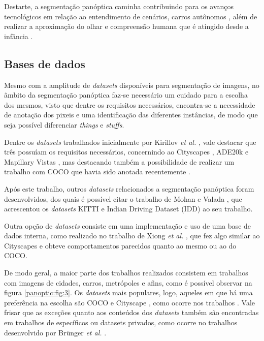 Destarte, a segmentação panóptica caminha contribuindo para os avanços tecnológicos em relação ao entendimento de cenários, carros autônomos \cite{Liu2019}, além de realizar a aproximação do olhar e compreensão humana que é atingido desde a infância \cite{Mohan2020}.

\subsection{Bases de dados}
\label{panoptic:dataset}
Mesmo com a amplitude de \textit{datasets} disponíveis para segmentação de imagens, no âmbito da segmentação panóptica faz-se necessário um cuidado para a escolha dos mesmos, visto que dentre os requisitos necessários, encontra-se a necessidade de anotação dos pixeis e uma identificação das diferentes instâncias, de modo que seja possível diferenciar \textit{things} e \textit{stuffs}.

Dentre os \textit{datasets} trabalhados inicialmente por Kirillov \textit{et al.} \cite{Kirillov2019a}, vale destacar que três possuíam os requisitos necessários, concernindo ao Cityscapes \cite{Cordts2016}, ADE20k \cite{Zhou2016} e Mapillary Vistas \cite{Neuhold2017_ICCV}, mas destacando também a possibilidade de realizar um trabalho com COCO \cite{Lin2014} que havia sido anotada recentemente \cite{Kirillov2019a}.

Após este trabalho, outros \textit{datasets} relacionados a segmentação panóptica foram desenvolvidos, dos quais é possível citar o trabalho de Mohan e Valada \cite{Mohan2020}, que acrescentou os \textit{datasets} KITTI \cite{Geiger2013} e Indian Driving Dataset (IDD) \cite{Varma2018} ao seu trabalho.

Outra opção de \textit{datasets} consiste em uma implementação e uso de uma base de dados interna, como realizado no trabalho de Xiong \textit{et al.} \cite{Xiong2019}, que fez algo similar ao Cityscapes e obteve comportamentos parecidos quanto ao mesmo ou ao do COCO.

De modo geral, a maior parte dos trabalhos realizados consistem em trabalhos com imagens de cidades, carros, metrópoles e afins, como é possível observar na figura \ref{panoptic:fig:3}. Os \textit{datasets} mais populares, logo, aqueles em que há uma preferência na escolha são COCO \cite{Caesar2016, Lin2014} e Cityscape \cite{Cordts2016}, como ocorre nos trabalhos \cite{Chen2019, DeGeus2019a, DeGeus2019, Hou2019, Liu2019, Xiong2019}. Vale frisar que as exceções quanto aos conteúdos dos \textit{datasets} também são encontradas em trabalhos de específicos ou datasets privados, como ocorre no trabalhos desenvolvido por Brünger \textit{et al.} \cite{Brunger2020}.

